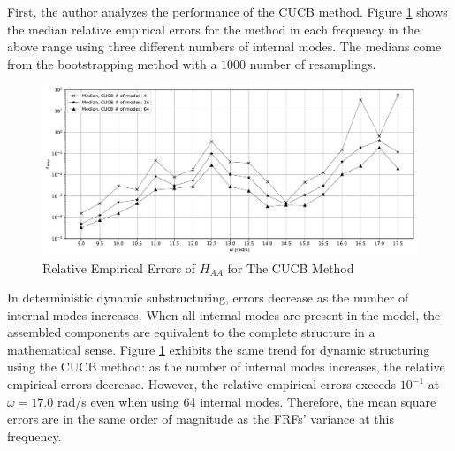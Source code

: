 First, the author analyzes the performance of the CUCB method.
Figure \ref{e_emp CUCB_A_A} shows the median relative empirical errors for the method in each frequency in the above range using three different numbers of internal modes.
The medians come from the bootstrapping method with a $1000$ number of resamplings.
\begin{figure}[H]
    \centering
    \includegraphics[width=1.0\textwidth]{
        plots/substructuring/plot_2.pdf
    }
    \caption{%
        Relative Empirical Errors of $H_{AA}$ for The CUCB Method
    }
    \label{e_emp CUCB_A_A}
\end{figure}
In deterministic dynamic substructuring, errors decrease as the number of internal modes increases.
When all internal modes are present in the model, the assembled components are equivalent to the complete structure in a mathematical sense.
Figure \ref{e_emp CUCB_A_A} exhibits the same trend for dynamic structuring using the CUCB method: as the number of internal modes increases, the relative empirical errors decrease.
However, the relative empirical errors exceeds $10^{-1}$ at $\omega=17.0$ rad/s even when using $64$ internal modes.
Therefore, the mean square errors are in the same order of magnitude as the FRFs' variance at this frequency.

